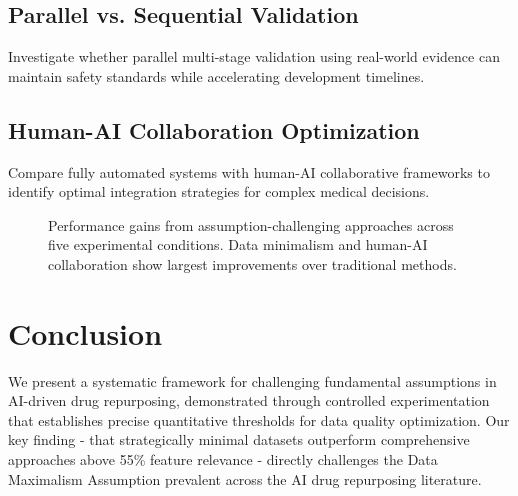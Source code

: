 \documentclass{article}
\begin{document}
\subsection{Parallel vs. Sequential Validation}
Investigate whether parallel multi-stage validation using real-world evidence can maintain safety standards while accelerating development timelines.

\subsection{Human-AI Collaboration Optimization}
Compare fully automated systems with human-AI collaborative frameworks to identify optimal integration strategies for complex medical decisions.

\begin{figure}[t]
\centering
{}
\caption{Performance gains from assumption-challenging approaches across five experimental conditions. Data minimalism and human-AI collaboration show largest improvements over traditional methods.}
\label{fig:performance_gains}
\end{figure}

\section{Conclusion}

We present a systematic framework for challenging fundamental assumptions in AI-driven drug repurposing, demonstrated through controlled experimentation that establishes precise quantitative thresholds for data quality optimization. Our key finding - that strategically minimal datasets outperform comprehensive approaches above 55\% feature relevance - directly challenges the Data Maximalism Assumption prevalent across the AI drug repurposing literature.
\end{document}
